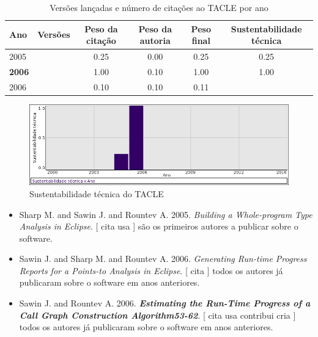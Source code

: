 \begin{table}[H]
\caption{Versões lançadas e número de citações ao TACLE por ano}
\centering
\begin{tabular}{| l | c | c | c | c | c |}
  \hline
  Ano & Versões & Peso da citação & Peso da autoria & Peso final & Sustentabilidade técnica \\
  \hline
            2005
          &
          
          &
          0.25
          &
          0.00
          &
          0.25
          &
            {\color{red} 0.25}
          \\
\hline
            {\bf 2006}
          &
          
          &
          1.00
          &
          0.10
          &
          1.00
          &
            {\color{blue} 1.00}
          \\
            2006
          &
          
          &
          0.10
          &
          0.10
          &
          0.11
          &
          \\
\hline
\end{tabular}
\end{table}

\begin{figure}[h]
  \center
  \includegraphics[scale=0.50]{imagens/softwares-charts/tacle.png}
  \caption{Sustentabilidade técnica do TACLE}
\end{figure}


\begin{itemize}
\item Sharp M. and Sawin J. and Rountev A.
      2005.
        \textit{ Building a Whole-program Type Analysis in Eclipse}.
      [
          cita
          usa
      ]
são os primeiros autores a publicar sobre o software.
\item Sawin J. and Sharp M. and Rountev A.
      2006.
        \textit{ Generating Run-time Progress Reports for a Points-to Analysis in Eclipse}.
      [
          cita
      ]
todos os autores já publicaram sobre o software em anos anteriores.
\item Sawin J. and Rountev A.
      2006.
        \textbf{\textit{ Estimating the Run-Time Progress of a Call Graph Construction Algorithm53-62}}.
      [
          cita
          usa
          contribui
          cria
      ]
todos os autores já publicaram sobre o software em anos anteriores.
\end{itemize}
